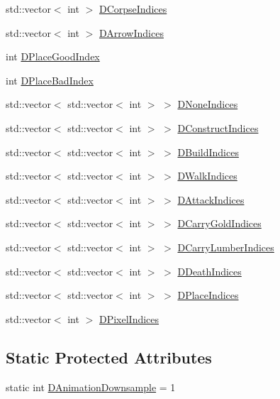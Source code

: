 \begin{DoxyCompactItemize}
\item 
std\+::vector$<$ int $>$ \hyperlink{classCAssetRenderer_a572091e74ab9acfa21d2c7c55a966886}{D\+Corpse\+Indices}
\item 
std\+::vector$<$ int $>$ \hyperlink{classCAssetRenderer_a7bc2bb5c49d9ed462f5d9dec8bc3b939}{D\+Arrow\+Indices}
\item 
int \hyperlink{classCAssetRenderer_a2bf69fa52909e0daccd3b3afc8c79119}{D\+Place\+Good\+Index}
\item 
int \hyperlink{classCAssetRenderer_a765462ccdeccb81926f565e5d403ed6d}{D\+Place\+Bad\+Index}
\item 
std\+::vector$<$ std\+::vector$<$ int $>$ $>$ \hyperlink{classCAssetRenderer_adfa7285e46e798a7d34a935bc7a6df6c}{D\+None\+Indices}
\item 
std\+::vector$<$ std\+::vector$<$ int $>$ $>$ \hyperlink{classCAssetRenderer_a1790a8f6992efbb3fea59dde42a3cacb}{D\+Construct\+Indices}
\item 
std\+::vector$<$ std\+::vector$<$ int $>$ $>$ \hyperlink{classCAssetRenderer_aa892b01d11bef2aca7491461eb97dffb}{D\+Build\+Indices}
\item 
std\+::vector$<$ std\+::vector$<$ int $>$ $>$ \hyperlink{classCAssetRenderer_a9975fd583c826c9905ccd080659bd3c5}{D\+Walk\+Indices}
\item 
std\+::vector$<$ std\+::vector$<$ int $>$ $>$ \hyperlink{classCAssetRenderer_acc2d0fab5a9f1f35a1d5eaf28ff743cc}{D\+Attack\+Indices}
\item 
std\+::vector$<$ std\+::vector$<$ int $>$ $>$ \hyperlink{classCAssetRenderer_aaf8c772b7d3fbe8c145282e5106749d6}{D\+Carry\+Gold\+Indices}
\item 
std\+::vector$<$ std\+::vector$<$ int $>$ $>$ \hyperlink{classCAssetRenderer_a986dc401334deb267cb772ff0650fcb6}{D\+Carry\+Lumber\+Indices}
\item 
std\+::vector$<$ std\+::vector$<$ int $>$ $>$ \hyperlink{classCAssetRenderer_a31be8b0e563072ee1168ab11154d15c8}{D\+Death\+Indices}
\item 
std\+::vector$<$ std\+::vector$<$ int $>$ $>$ \hyperlink{classCAssetRenderer_a5d20fe39b33a35847b7332b46cfbf3c6}{D\+Place\+Indices}
\item 
std\+::vector$<$ int $>$ \hyperlink{classCAssetRenderer_aa1d9cd6de6b897ec0b5a244bf822e6bd}{D\+Pixel\+Indices}
\end{DoxyCompactItemize}
\subsection*{Static Protected Attributes}
\begin{DoxyCompactItemize}
\item 
static int \hyperlink{classCAssetRenderer_a13ea9a19837c39e57db499f53366c5b8}{D\+Animation\+Downsample} = 1
\end{DoxyCompactItemize}


